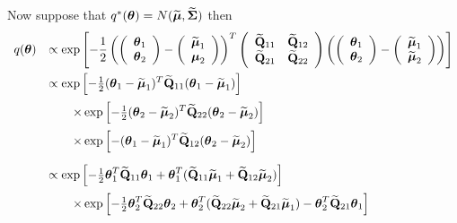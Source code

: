 \documentclass[12pt]{article}
\begin{document}
\begin{enumerate}
    \noindent Now suppose that $q^*({\boldsymbol \theta})= N(\widetilde{{\boldsymbol \mu}},\widetilde{{\boldsymbol \Sigma}})$ then
    $$
    \begin{array}{rl}
    q({\boldsymbol \theta}) 
    & \displaystyle \propto \exp\left[ 
    - \frac{1}{2}\left( \left( \begin{array}{c} {\boldsymbol\theta}_1 \\ {\boldsymbol \theta}_2\end{array} \right) - \left( \begin{array}{c} \widetilde{{\boldsymbol \mu}}_1 \\ {\boldsymbol \mu}_2\end{array} \right)  \right)^T\left( \begin{array}{cc} \widetilde{{\bf Q}}_{11} & \widetilde{{\bf Q}}_{12} \\ \widetilde{{\bf Q}}_{21} & \widetilde{{\bf Q}}_{22}\end{array} \right)  \left( \left( \begin{array}{c} {\boldsymbol\theta}_1 \\ {\boldsymbol \theta}_2\end{array} \right) - \left( \begin{array}{c} \widetilde{{\boldsymbol \mu}}_1 \\ \widetilde{{\boldsymbol \mu}}_2\end{array} \right)  \right)
    \right] 
    \\ [3ex]
    & \displaystyle \propto 
    \exp\left[ - \tfrac{1}{2}({\boldsymbol \theta}_1 - \widetilde{{\boldsymbol \mu}}_1)^T\widetilde{{\bf Q}}_{11}({\boldsymbol \theta}_1 - \widetilde{{\boldsymbol \mu}}_1) \right]
    \\ [2ex]
    & \displaystyle \qquad \times \exp\left[ - \tfrac{1}{2}({\boldsymbol \theta}_2 - \widetilde{{\boldsymbol \mu}}_2)^T\widetilde{{\bf Q}}_{22}({\boldsymbol \theta}_2 - \widetilde{{\boldsymbol \mu}}_2) \right]
        \\ [2ex]
    & \displaystyle \qquad \times \exp\left[ - ({\boldsymbol \theta}_1 - \widetilde{{\boldsymbol \mu}}_1)^T\widetilde{{\bf Q}}_{12}({\boldsymbol \theta}_2 - \widetilde{{\boldsymbol \mu}}_2)
    \right] 
    \\ [3ex]
    & \displaystyle \propto 
    \exp\left[ - \tfrac{1}{2}{\boldsymbol \theta}_1^T\widetilde{{\bf Q}}_{11}{\boldsymbol \theta}_1 
    + {\boldsymbol \theta}_1^T(\widetilde{{\bf Q}}_{11}\widetilde{{\boldsymbol \mu}}_1 + \widetilde{{\bf Q}}_{12}\widetilde{{\boldsymbol \mu}}_2) \right] 
            \\ [2ex]
    & \displaystyle \qquad \times 
    \exp\left[ - \tfrac{1}{2}{\boldsymbol \theta}_2^T\widetilde{{\bf Q}}_{22}{\boldsymbol \theta}_2 + {\boldsymbol \theta}_2^T(\widetilde{{\bf Q}}_{22}\widetilde{{\boldsymbol \mu}}_2 + \widetilde{{\bf Q}}_{21}\widetilde{{\boldsymbol \mu}}_1)
    - {\boldsymbol \theta}_2^T\widetilde{{\bf Q}}_{21}{\boldsymbol \theta}_1 \right] 
    \end{array} 
    $$
    

\end{enumerate}
\end{document}
